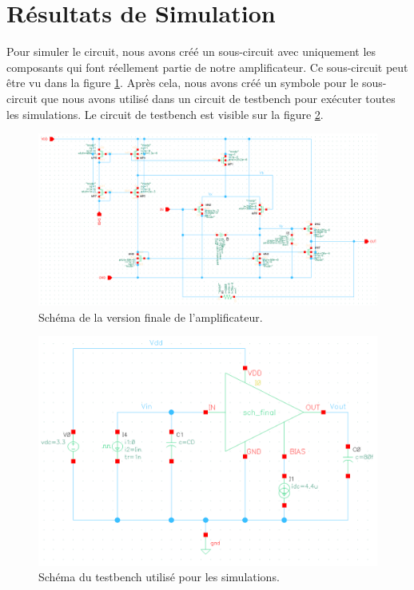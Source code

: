 \documentclass[a4paper,12pt]{article}
\numberwithin{equation}{section}
\newcommand{\?}{\stackrel{?}{=}}
\begin{document}
\FloatBarrier
\newpage
\section{Résultats de Simulation}\label{sec:simulations}

Pour simuler le circuit, nous avons créé un sous-circuit avec uniquement les composants qui font réellement partie de notre amplificateur. Ce sous-circuit peut être vu dans la figure \ref{fig:csh_final}. Après cela, nous avons créé un symbole pour le sous-circuit que nous avons utilisé dans un circuit de testbench pour exécuter toutes les simulations. Le circuit de testbench est visible sur la figure \ref{fig:sch_bench}.

\begin{figure}[htp!]
    \centering
    \includegraphics[width=\linewidth]{images/csh_final.png}
    \caption{Schéma de la version finale de l'amplificateur.}
    \label{fig:csh_final}
\end{figure}

\begin{figure}[htp!]
    \centering
    \includegraphics[width=0.7\linewidth]{images/sch_bench.png}
    \caption{Schéma du testbench utilisé pour les simulations.}
    \label{fig:sch_bench}
\end{figure}
\end{document}
